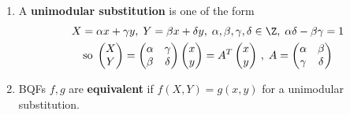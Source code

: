 \documentclass{article}
\begin{document}
\begin{defi}
    \leavevmode
    \begin{enumerate}[label=(\arabic*)]
        \item A \textbf{unimodular substitution} is one of the form
            \begin{gather*}
                X = \alpha x + \gamma y, \; Y = \beta x + \delta y, \; \alpha, \beta, \gamma, \delta \in \Z, \; \alpha \delta - \beta \gamma = 1 \\
                \text{so} \;
                \begin{pmatrix} X \\ Y \end{pmatrix}
                =
                \begin{pmatrix} \alpha & \gamma \\ \beta & \delta \end{pmatrix}
                \begin{pmatrix} x \\ y \end{pmatrix}
                = A^T
                \begin{pmatrix} x \\ y \end{pmatrix}
                \, , \;
                A =
                \begin{pmatrix} \alpha & \beta \\ \gamma & \delta \end{pmatrix}
            \end{gather*}
        \item BQFs $f, g$ are \textbf{equivalent} if $f(X, Y) = g(x, y)$ for a unimodular substitution.
    \end{enumerate}
\end{defi}
\end{document}
